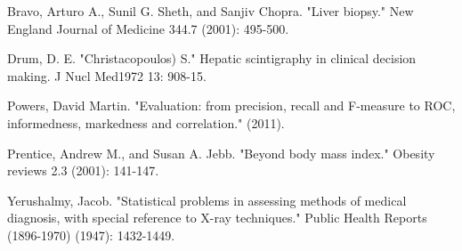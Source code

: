 \documentclass[12pt]{article}
\begin{document}
\begin{thebibliography}{1}
Bravo, Arturo A., Sunil G. Sheth, and Sanjiv Chopra. "Liver biopsy." New England Journal of Medicine 344.7 (2001): 495-500.

Drum, D. E. "Christacopoulos) S." Hepatic scintigraphy in clinical decision making. J Nucl Med1972 13: 908-15.

Powers, David Martin. "Evaluation: from precision, recall and F-measure to ROC, informedness, markedness and correlation." (2011).

Prentice, Andrew M., and Susan A. Jebb. "Beyond body mass index." Obesity reviews 2.3 (2001): 141-147.

Yerushalmy, Jacob. "Statistical problems in assessing methods of medical diagnosis, with special reference to X-ray techniques." Public Health Reports (1896-1970) (1947): 1432-1449.




\end{thebibliography}
\smallskip
\end{document}

